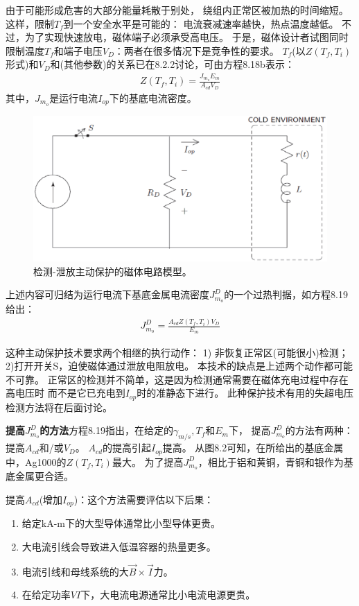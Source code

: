 由于可能形成危害的大部分能量耗散于别处，
绕组内正常区被加热的时间缩短。这样，限制$T_f$到一个安全水平是可能的：
电流衰减速率越快，热点温度越低。
不过，为了实现快速放电，磁体端子必须承受高电压。
于是，磁体设计者试图同时限制温度$T_f$和端子电压$V_D$：两者在很多情况下是竞争性的要求。
$T_f$(以$Z(T_f,T_i)$形式)和$V_D$和(其他参数)的关系已在8.2.2讨论，可由方程8.18b表示：
\begin{align*}%
Z(T_f,T_i)=\frac{J_{m_o}E_m}{A_{cd}V_D}\tag{8.18b}
\end{align*}
其中，$J_{m_o}$是运行电流$I_{op}$下的基底电流密度。

\begin{figure}
	\centering
	\includegraphics[scale=0.4]{chpt8/figs/fig8.17.eps}
	\caption{检测-泄放主动保护的磁体电路模型。}
\end{figure}

上述内容可归结为运行电流下基底金属电流密度$J_{m_o}^D$的一个过热判据，如方程8.19给出：
\begin{align*}%
J_{m_o}^{D}=\frac{A_{cd}Z(T_f,T_i)V_D}{E_m}\tag{8.19}
\end{align*}

这种主动保护技术要求两个相继的执行动作：
1) 非恢复正常区(可能很小)检测；2)打开开关S，迫使磁体通过泄放电阻放电。
本技术的缺点是上述两个动作都可能不可靠。
正常区的检测并不简单，这是因为检测通常需要在磁体充电过程中存在高电压时
而不是它已充电到$I_{op}$时的准静态下进行。
此种保护技术有用的失超电压检测方法将在后面讨论。

\textbf{提高$J_{m_o}^D$的方法}\quad 方程8.19指出，在给定的$\gamma_{m/s}, T_f$和$E_m$下，
提高$J_{m_o}^D$的方法有两种：提高$A_{cd}$和/或$V_D$。
$A_{cd}$的提高引起$I_{op}$提高。
从图8.2可知，在所给出的基底金属中，Ag1000的$Z(T_f,T_i)$最大。
为了提高$J_{m_o}^D$，相比于铝和黄铜，青铜和银作为基底金属更合适。

提高$A_{cd}$(增加$I_{op}$)：这个方法需要评估以下后果：
\begin{enumerate}
	\item 给定kA-m下的大型导体通常比小型导体更贵。
	\item 大电流引线会导致进入低温容器的热量更多。
	\item 电流引线和母线系统的大$\vec{B}\times \vec{I}$力。
	\item 在给定功率$VI$下，大电流电源通常比小电流电源更贵。	
\end{enumerate}


